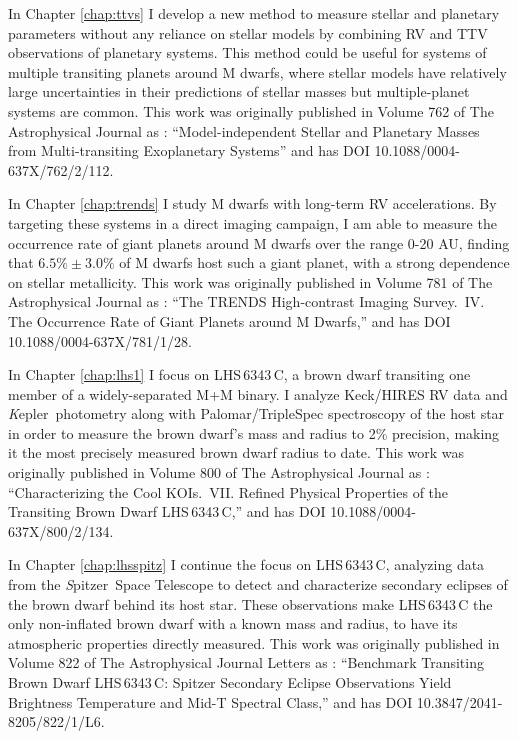 \documentclass[12pt]{caltech_thesis}
\newcommand{\kep}{{\textit Kepler}}
\newcommand{\spitz}{{\textit Spitzer}}
\begin{document}
In Chapter \ref{chap:ttvs} I develop a new method to measure stellar and planetary 
parameters without any reliance on stellar models by combining RV and TTV observations
of planetary systems.
This method could be useful for systems of multiple transiting planets around M dwarfs,
where stellar models have relatively large uncertainties in their predictions of stellar
masses but multiple-planet systems are common.
This work was originally published in Volume 762 of The Astrophysical Journal as \citet{Montet13}: ``Model-independent Stellar and Planetary Masses from Multi-transiting Exoplanetary Systems'' and has DOI 10.1088/0004-637X/762/2/112.

In Chapter \ref{chap:trends} I study M dwarfs with long-term RV accelerations.
By targeting these systems in a direct imaging campaign, I am able to measure the
occurrence rate of giant planets around M dwarfs over the range 0-20 AU, finding
that $6.5\% \pm 3.0\%$ of M dwarfs host such a giant planet, with a strong dependence
on stellar metallicity. This work was originally published in Volume 781 of The
Astrophysical Journal as \citet{Montet14}: ``The TRENDS High-contrast Imaging Survey.\ IV. The Occurrence Rate of Giant Planets around M Dwarfs,'' and has DOI 10.1088/0004-637X/781/1/28.

In Chapter \ref{chap:lhs1} I focus on LHS\,6343\,C, a brown dwarf transiting one member
of a widely-separated M+M binary. I analyze Keck/HIRES RV data and \kep\ photometry
along with Palomar/TripleSpec spectroscopy of the host star 
in order to measure the brown dwarf's mass and radius to 2\% precision, making it the
most precisely measured brown dwarf radius to date. This work was originally published
in Volume 800 of The Astrophysical Journal as \citet{Montet15a}: ``Characterizing the Cool KOIs.\ VII. Refined Physical Properties of the Transiting Brown Dwarf LHS\,6343\,C,''
and has DOI 10.1088/0004-637X/800/2/134.


In Chapter \ref{chap:lhsspitz} I continue the focus on LHS\,6343\,C,
analyzing data from the \spitz\ Space Telescope to detect and characterize secondary eclipses of the brown dwarf behind its host star.
These observations make LHS\,6343\,C the only non-inflated brown dwarf with a known  mass and radius, to have its atmospheric properties directly measured. 
This work was originally published in Volume 822 of The Astrophysical Journal Letters
as \citet{Montet16a}:
``Benchmark Transiting Brown Dwarf LHS\,6343\,C: Spitzer Secondary Eclipse Observations Yield Brightness Temperature and Mid-T Spectral Class,'' and has DOI
10.3847/2041-8205/822/1/L6.
\end{document}
